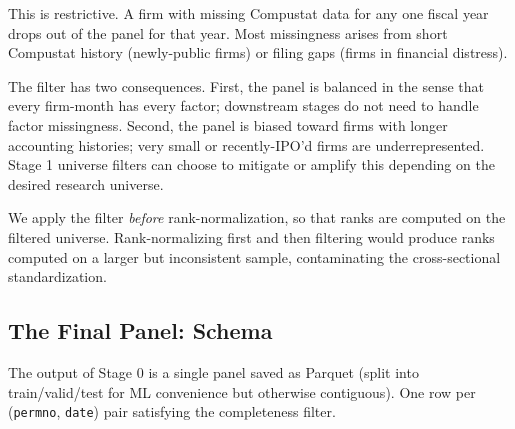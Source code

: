 This is restrictive. A firm with missing Compustat data for any one
fiscal year drops out of the panel for that year. Most missingness
arises from short Compustat history (newly-public firms) or filing
gaps (firms in financial distress).

The filter has two consequences. First, the panel is balanced in the
sense that every firm-month has every factor; downstream stages do not
need to handle factor missingness. Second, the panel is biased toward
firms with longer accounting histories; very small or recently-IPO'd
firms are underrepresented. Stage 1 universe filters can choose to
mitigate or amplify this depending on the desired research universe.

We apply the filter \emph{before} rank-normalization, so that ranks are
computed on the filtered universe. Rank-normalizing first and then
filtering would produce ranks computed on a larger but inconsistent
sample, contaminating the cross-sectional standardization.

\subsection{The Final Panel: Schema}
\label{subsec:stage0-schema}

The output of Stage 0 is a single panel saved as Parquet (split into
train/valid/test for ML convenience but otherwise contiguous). One row
per (\texttt{permno}, \texttt{date}) pair satisfying the completeness
filter.

